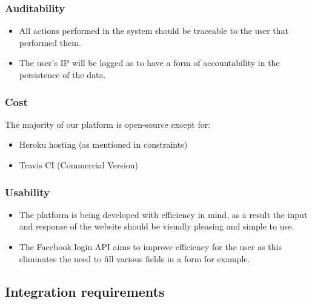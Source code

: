 \documentclass{article}
\begin{document}
		\subsubsection{Auditability}
		\begin{itemize}
			\item All actions performed in the system should be traceable to the user that performed them.
			\item The user's IP  will be logged as to have a form of accountability in the persistence of the data.
		\end{itemize}
		\subsubsection{Cost}
		The majority of our platform is open-source except for:
		\begin{itemize}
			\item Heroku hosting (as mentioned in constraints)
			\item Travis CI (Commercial Version)		
		\end{itemize}
		\subsubsection{Usability}
		\begin{itemize}
			\item The platform is being developed with efficiency in mind, as a result the input and response of the website should be visually pleasing and simple to use.
			\item The Facebook login API aims to improve efficiency for the user as this eliminates the need to fill various fields in a form for example.
		\end{itemize}
		 

		

	\subsection{Integration requirements}
	
\end{document}
